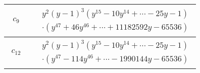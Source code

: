 \documentclass[1p]{elsarticle_modified}
\theoremstyle{definition}
\begin{document}
\begin{tabular}{m{50pt}|m{274pt}}
\hline $$\begin{aligned}c_{9}\end{aligned}$$&$\begin{aligned}
&y^2(y-1)^3(y^{15}-10 y^{14}+\cdots-25 y-1)\\
&\cdot(y^{47}+46 y^{46}+\cdots+11182592 y-65536)
\end{aligned}$\\
\hline $$\begin{aligned}c_{12}\end{aligned}$$&$\begin{aligned}
&y^2(y-1)^3(y^{15}-10 y^{14}+\cdots-25 y-1)\\
&\cdot(y^{47}-114 y^{46}+\cdots-1990144 y-65536)
\end{aligned}$\\
\hline
\end{tabular}
\vskip 2pc
\end{document}
